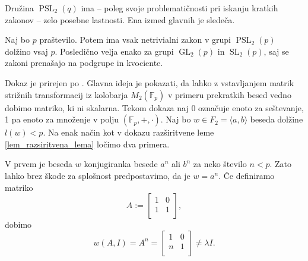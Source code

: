     Družina $\operatorname{PSL}_2(q)$ ima -- poleg svoje problematičnosti pri iskanju kratkih zakonov -- zelo posebne lastnosti. Ena izmed glavnih je sledeča. 
    \begin{trditev}\label{trd_dolzina_zakonov_za_psl2p}
    Naj bo $p$ praštevilo. Potem ima vsak netrivialni zakon v grupi $\operatorname{PSL}_2(p)$ dolžino vsaj $p$. Posledično velja enako za grupi $\operatorname{GL}_2(p)$ in $\operatorname{SL}_2(p)$,
    saj se zakoni prenašajo na podgrupe in kvociente.
    \end{trditev}
    \begin{dokaz}
        Dokaz je prirejen po \cite[str.~38--39]{Schneider_2016}. Glavna ideja je pokazati, da lahko z vstavljanjem matrik strižnih transformacij iz kolobarja $M_2(\mathbb{F}_p)$
        v primeru prekratkih besed vedno dobimo matriko, ki ni skalarna. Tekom dokaza naj 0 označuje enoto za seštevanje, 1 pa enoto za množenje v polju $(\mathbb{F}_p, +, \cdot)$.
        Naj bo $w \in F_2 = \langle  a, b \rangle$ beseda dolžine $l(w) < p$. 
         Na enak način kot v dokazu razširitvene leme \ref{lem_razsiritvena_lema} ločimo dva primera.
         
         V prvem je beseda $w$ konjugiranka besede $a^{n}$ ali $b^{n}$ za neko število $n < p$. Zato lahko brez škode za splošnost predpostavimo, da je $w = a^{n}$.
         Če definiramo matriko \begin{equation*}
         A := \begin{bmatrix}
            1 & 0\\
            1 & 1 \\
         \end{bmatrix},
         \end{equation*}  
            dobimo \begin{equation*}
            w(A, I) = A^{n} =  \begin{bmatrix}
                1 & 0\\
                n & 1\\
             \end{bmatrix} \neq \lambda I.
            \end{equation*}  
        

\end{dokaz}
